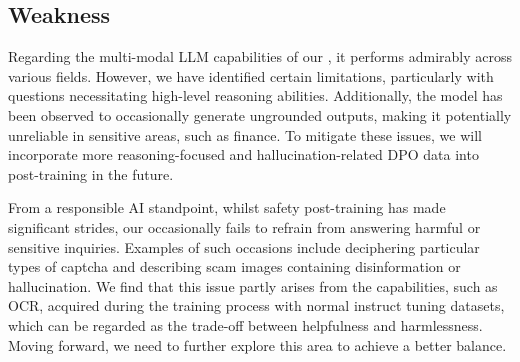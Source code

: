 \subsection{Weakness}
Regarding the multi-modal LLM capabilities of our \phivision, it performs admirably across various fields. However, we have identified certain limitations, particularly with questions necessitating high-level reasoning abilities. Additionally, the model has been observed to occasionally generate ungrounded outputs, making it potentially unreliable in sensitive areas, such as finance. To mitigate these issues, we will incorporate more reasoning-focused and hallucination-related DPO data into post-training in the future. 

From a responsible AI standpoint, whilst safety post-training has made significant strides, our \phivision occasionally fails to refrain from answering harmful or sensitive inquiries. Examples of such occasions include deciphering particular types of captcha and describing scam images containing disinformation or hallucination. We find that this issue partly arises from the capabilities, such as OCR, acquired during the training process with normal instruct tuning datasets, which can be regarded as the trade-off between helpfulness and harmlessness. Moving forward, we need to further explore this area to achieve a better balance.

